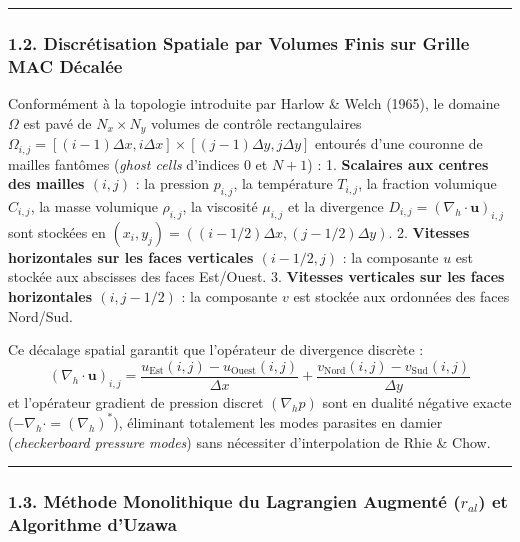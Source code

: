 \documentclass[
  10pt,
]{article}
\begin{document}
\begin{center}\rule{0.5\linewidth}{0.5pt}\end{center}

\subsubsection{1.2. Discrétisation Spatiale par Volumes Finis sur Grille
MAC
Décalée}\label{discruxe9tisation-spatiale-par-volumes-finis-sur-grille-mac-duxe9caluxe9e}

Conformément à la topologie introduite par Harlow \& Welch (1965), le
domaine \(\Omega\) est pavé de \(N_x \times N_y\) volumes de contrôle
rectangulaires
\(\Omega_{i,j} = [(i-1)\Delta x, i\Delta x] \times [(j-1)\Delta y, j\Delta y]\)
entourés d'une couronne de mailles fantômes (\emph{ghost cells}
d'indices \(0\) et \(N+1\)) : 1. \textbf{Scalaires aux centres des
mailles \((i, j)\)} : la pression \(p_{i,j}\), la température
\(T_{i,j}\), la fraction volumique \(C_{i,j}\), la masse volumique
\(\rho_{i,j}\), la viscosité \(\mu_{i,j}\) et la divergence
\(D_{i,j} = (\nabla_h \cdot \mathbf{u})_{i,j}\) sont stockées en
\((x_i, y_j) = ((i - 1/2)\Delta x, (j - 1/2)\Delta y)\). 2.
\textbf{Vitesses horizontales sur les faces verticales \((i-1/2, j)\)} :
la composante \(u\) est stockée aux abscisses des faces Est/Ouest. 3.
\textbf{Vitesses verticales sur les faces horizontales \((i, j-1/2)\)} :
la composante \(v\) est stockée aux ordonnées des faces Nord/Sud.

Ce décalage spatial garantit que l'opérateur de divergence discrète :
\[(\nabla_h \cdot \mathbf{u})_{i,j} = \frac{u_{\text{Est}}(i,j) - u_{\text{Ouest}}(i,j)}{\Delta x} + \frac{v_{\text{Nord}}(i,j) - v_{\text{Sud}}(i,j)}{\Delta y}\]
et l'opérateur gradient de pression discret \((\nabla_h p)\) sont en
dualité négative exacte (\(-\nabla_h \cdot = (\nabla_h)^*\)), éliminant
totalement les modes parasites en damier (\emph{checkerboard pressure
modes}) sans nécessiter d'interpolation de Rhie \& Chow.

\begin{center}\rule{0.5\linewidth}{0.5pt}\end{center}

\subsubsection{\texorpdfstring{1.3. Méthode Monolithique du Lagrangien
Augmenté (\(r_{al}\)) et Algorithme
d'Uzawa}{1.3. Méthode Monolithique du Lagrangien Augmenté (r\_\{al\}) et Algorithme d'Uzawa}}\label{muxe9thode-monolithique-du-lagrangien-augmentuxe9-r_al-et-algorithme-duzawa}
\end{document}
